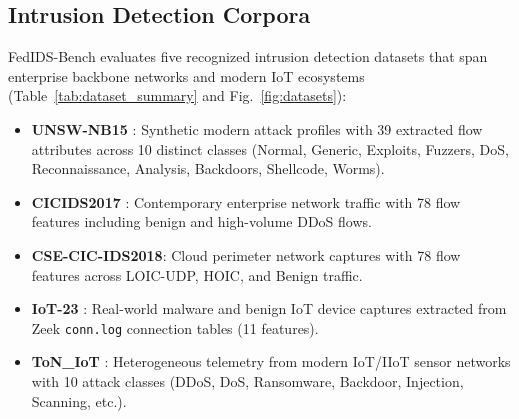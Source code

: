 \documentclass[runningheads]{llncs}
\begin{document}
\subsection{Intrusion Detection Corpora}
FedIDS-Bench evaluates five recognized intrusion detection datasets that span enterprise backbone networks and modern IoT ecosystems (Table~\ref{tab:dataset_summary} and Fig.~\ref{fig:datasets}):
\begin{itemize}
    \item \textbf{UNSW-NB15} \cite{moustafa2015unsw}: Synthetic modern attack profiles with 39 extracted flow attributes across 10 distinct classes (Normal, Generic, Exploits, Fuzzers, DoS, Reconnaissance, Analysis, Backdoors, Shellcode, Worms).
    \item \textbf{CICIDS2017} \cite{sharafaldin2018toward}: Contemporary enterprise network traffic with 78 flow features including benign and high-volume DDoS flows.
    \item \textbf{CSE-CIC-IDS2018}: Cloud perimeter network captures with 78 flow features across LOIC-UDP, HOIC, and Benign traffic.
    \item \textbf{IoT-23} \cite{garcia2020iot23}: Real-world malware and benign IoT device captures extracted from Zeek \texttt{conn.log} connection tables (11 features).
    \item \textbf{ToN\_IoT} \cite{alsaedi2020ton}: Heterogeneous telemetry from modern IoT/IIoT sensor networks with 10 attack classes (DDoS, DoS, Ransomware, Backdoor, Injection, Scanning, etc.).
\end{itemize}

\begin{table}[t]
\caption{Intrusion Detection Telemetry Corpora Profile}
\label{tab:dataset_summary}
\centering
{}
\end{table}
\end{document}

